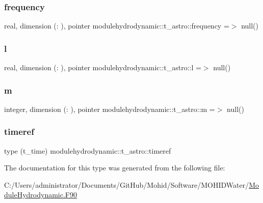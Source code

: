 \subsubsection{\texorpdfstring{frequency}{frequency}}
{\footnotesize\ttfamily real, dimension (\+:  ), pointer modulehydrodynamic\+::t\+\_\+astro\+::frequency =$>$ null()\hspace{0.3cm}{\ttfamily [private]}}

\mbox{\label{structmodulehydrodynamic_1_1t__astro_a53a2d4ac67625ffa305e5e2ef595cb4e}} 
\subsubsection{\texorpdfstring{l}{l}}
{\footnotesize\ttfamily real, dimension (\+:  ), pointer modulehydrodynamic\+::t\+\_\+astro\+::l =$>$ null()\hspace{0.3cm}{\ttfamily [private]}}

\mbox{\label{structmodulehydrodynamic_1_1t__astro_a9ff91e43bc997a334e20b6d86532092c}} 
\subsubsection{\texorpdfstring{m}{m}}
{\footnotesize\ttfamily integer, dimension (\+:  ), pointer modulehydrodynamic\+::t\+\_\+astro\+::m =$>$ null()\hspace{0.3cm}{\ttfamily [private]}}

\mbox{\label{structmodulehydrodynamic_1_1t__astro_adc249c77a98e8ad68cfc122740245af3}} 
\subsubsection{\texorpdfstring{timeref}{timeref}}
{\footnotesize\ttfamily type (t\+\_\+time) modulehydrodynamic\+::t\+\_\+astro\+::timeref\hspace{0.3cm}{\ttfamily [private]}}



The documentation for this type was generated from the following file\+:\begin{DoxyCompactItemize}
\item 
C\+:/\+Users/administrator/\+Documents/\+Git\+Hub/\+Mohid/\+Software/\+M\+O\+H\+I\+D\+Water/\mbox{\hyperlink{_module_hydrodynamic_8_f90}{Module\+Hydrodynamic.\+F90}}\end{DoxyCompactItemize}
